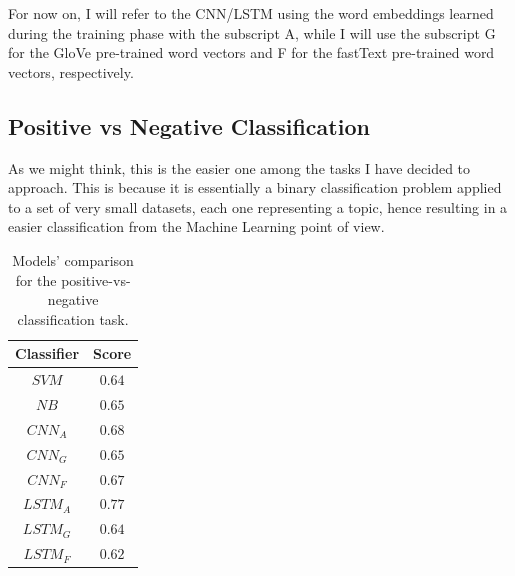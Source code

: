 \documentclass[11pt,twocolumn]{article}
\begin{document}
            \noindent
            For now on, I will refer to the CNN/LSTM using the word embeddings learned during the training
            phase with the subscript A, while I will use the subscript G for the GloVe pre-trained word
            vectors and F for the fastText pre-trained word vectors, respectively.

        \subsection{Positive vs Negative Classification} %
        \label{sub:positive_vs_negative_classification}
            As we might think, this is the easier one among the tasks I have decided to approach. This is
            because it is essentially a binary classification problem applied to a set of very small datasets,
            each one representing a topic, hence resulting in a easier classification from the Machine Learning
            point of view.

                \begin{table}[h]
                     \centering
                     \begin{tabular}{| c | c |}
                        \hline
                        \textbf{Classifier} & \textbf{Score} \\
                        \hline
                        $SVM$ & $0.64$ \\
                        \hline
                        $NB$ & $0.65$ \\
                        \hline
                        $CNN_A$ & $0.68$ \\
                        \hline
                        $CNN_G$ & $0.65$ \\
                        \hline
                        $CNN_F$ & $0.67$ \\
                        \hline
                        $LSTM_A$ & $0.77$ \\
                        \hline
                        $LSTM_G$ & $0.64$ \\
                        \hline
                        $LSTM_F$ & $0.62$ \\
                        \hline
                    \end{tabular}
                    \caption{Models' comparison for the positive-vs-negative classification task.}
                    \label{tab:pn_comparison}
                \end{table}
\end{document}
